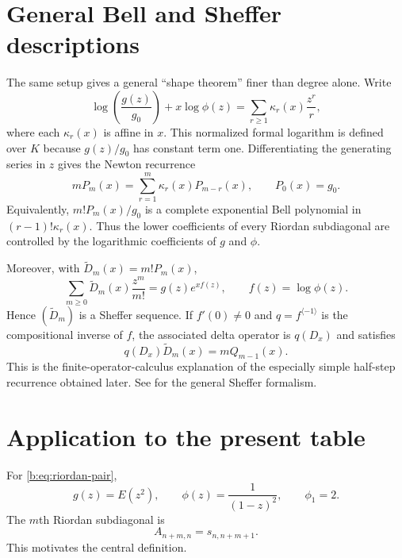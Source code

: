 \documentclass[11pt,a4paper,oneside,openany]{book}
\numberwithin{equation}{chapter}
\theoremstyle{definition}
\theoremstyle{remark}
\newcommand{\TM}{E}
\newcommand{\Dprim}{\widetilde D}
\begin{document}
\section{General Bell and Sheffer descriptions}

The same setup gives a general ``shape theorem'' finer than degree alone.
Write
\begin{equation}
 \log\!\left(\frac{g(z)}{g_0}\right)+x\log\phi(z)
 =\sum_{r\ge1}\kappa_r(x)\frac{z^r}{r},
 \label{b:eq:general-cumulants}
\end{equation}
where each $\kappa_r(x)$ is affine in $x$.  This normalized formal logarithm
is defined over $K$ because $g(z)/g_0$ has constant term one.  Differentiating the generating
series in $z$ gives the Newton recurrence
\begin{equation}
 mP_m(x)=\sum_{r=1}^{m}\kappa_r(x)P_{m-r}(x),
 \qquad P_0(x)=g_0.
 \label{b:eq:general-newton}
\end{equation}
Equivalently, $m!P_m(x)/g_0$ is a complete exponential Bell polynomial in
$(r-1)!\kappa_r(x)$.  Thus the lower coefficients of every Riordan
subdiagonal are controlled by the logarithmic coefficients of $g$ and
$\phi$.

Moreover, with $\Dprim_m(x)=m!P_m(x)$,
\begin{equation}
 \sum_{m\ge0}\Dprim_m(x)\frac{z^m}{m!}
 =g(z)e^{x f(z)},
 \qquad f(z)=\log\phi(z).
 \label{b:eq:general-sheffer}
\end{equation}
Hence $(\Dprim_m)$ is a Sheffer sequence.  If $f'(0)\ne0$ and $q=f^{\langle-1\rangle}$
is the compositional inverse of $f$, the associated delta operator is
$q(D_x)$ and satisfies
\begin{equation}
 q(D_x)\Dprim_m(x)=mQ_{m-1}(x).
 \label{b:eq:general-lowering}
\end{equation}
This is the finite-operator-calculus explanation of the especially simple
half-step recurrence obtained later.  See \cite{roman} for the general
Sheffer formalism.

\section{Application to the present table}

For \eqref{b:eq:riordan-pair},
\[
 g(z)=\TM(z^2),
 \qquad
 \phi(z)=\frac{1}{(1-z)^2},
 \qquad
 \phi_1=2.
\]
The $m$th Riordan subdiagonal is
\begin{equation}
 A_{n+m,n}=s_{n,n+m+1}.
\end{equation}
This motivates the central definition.
\end{document}
